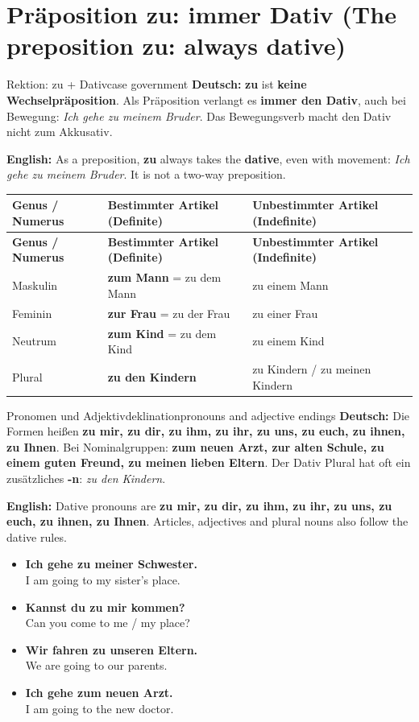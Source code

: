 \documentclass[a4paper,11pt]{article}
\newcommand{\GermanText}[1]{\textbf{Deutsch: }#1\par}
\newcommand{\EnglishText}[1]{{\small\color{SoftGray}\textbf{English: }#1\par}}
\newcommand{\ExampleItem}[2]{\item \textbf{#1}\\{\small\color{SoftGray}#2}}
\newcommand{\TableHead}[1]{\color{white}\textbf{#1}}
\begin{document}
\section{Präposition zu: immer Dativ (The preposition zu: always dative)}
\begin{grammarentry}{Rektion: zu + Dativ}{case government}
\GermanText{\textbf{zu} ist \textbf{keine Wechselpräposition}. Als Präposition verlangt es \textbf{immer den Dativ}, auch bei Bewegung: \emph{Ich gehe zu meinem Bruder}. Das Bewegungsverb macht den Dativ nicht zum Akkusativ.}
\EnglishText{As a preposition, \textbf{zu} always takes the \textbf{dative}, even with movement: \emph{Ich gehe zu meinem Bruder}. It is not a two-way preposition.}
\end{grammarentry}
\begin{longtable}{>{\raggedright\arraybackslash}p{3.2cm}>{\raggedright\arraybackslash}p{5.75cm}>{\raggedright\arraybackslash}p{5.85cm}}
\rowcolor{HeaderBlueDark}\TableHead{Genus / Numerus} & \TableHead{Bestimmter Artikel (Definite)} & \TableHead{Unbestimmter Artikel (Indefinite)}\\
\endfirsthead
\rowcolor{HeaderBlueDark}\TableHead{Genus / Numerus} & \TableHead{Bestimmter Artikel (Definite)} & \TableHead{Unbestimmter Artikel (Indefinite)}\\
\endhead
Maskulin & \textbf{zum Mann} = zu dem Mann & zu einem Mann\\
Feminin & \textbf{zur Frau} = zu der Frau & zu einer Frau\\
Neutrum & \textbf{zum Kind} = zu dem Kind & zu einem Kind\\
Plural & \textbf{zu den Kindern} & zu Kindern / zu meinen Kindern\\
\end{longtable}
\begin{grammarentry}{Pronomen und Adjektivdeklination}{pronouns and adjective endings}
\GermanText{Die Formen heißen \textbf{zu mir, zu dir, zu ihm, zu ihr, zu uns, zu euch, zu ihnen, zu Ihnen}. Bei Nominalgruppen: \textbf{zum neuen Arzt, zur alten Schule, zu einem guten Freund, zu meinen lieben Eltern}. Der Dativ Plural hat oft ein zusätzliches \textbf{-n}: \emph{zu den Kindern}.}
\EnglishText{Dative pronouns are \textbf{zu mir, zu dir, zu ihm, zu ihr, zu uns, zu euch, zu ihnen, zu Ihnen}. Articles, adjectives and plural nouns also follow the dative rules.}
\end{grammarentry}
\begin{exbox}\begin{itemize}
\ExampleItem{Ich gehe zu meiner Schwester.}{I am going to my sister's place.}
\ExampleItem{Kannst du zu mir kommen?}{Can you come to me / my place?}
\ExampleItem{Wir fahren zu unseren Eltern.}{We are going to our parents.}
\ExampleItem{Ich gehe zum neuen Arzt.}{I am going to the new doctor.}
\end{itemize}\end{exbox}
\end{document}
